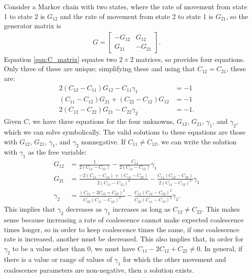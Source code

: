 \documentclass{article}
\begin{document}
Consider a Markov chain with two states, 
where the rate of movement from state 1 to state 2 is $G_{12}$
and the rate of movement from state 2 to state 1 is $G_{21}$,
so the generator matrix is
\begin{align*}
G = 
    \begin{bmatrix}
        -G_{12}  & G_{12} \\
         G_{21}  & -G_{21}
    \end{bmatrix}.
\end{align*}
Equation \ref{eqn:C_matrix} equates two $2 \times 2$ matrices,
so provides four equations. Only three of these are unique;
simplifying these and using that $C_{12} = C_{21}$, these are:
\begin{align*}
    2 \left(C_{12} - C_{11} \right) G_{12} - C_{11} \gamma_1 &= -1 \\
    \left(C_{11} - C_{12} \right) G_{21} + \left(C_{22} - C_{12}\right) G_{12} &= -1 \\
    2 \left( C_{12} - C_{22} \right) G_{21} - C_{22} \gamma_2 &= -1 .
\end{align*}
Given $C$, we have three equations for the four unknowns, 
$G_{12}$, $G_{21}$, $\gamma_{1}$, and $\gamma_{2}$,
which we can solve symbolically.
The valid solutions to these equations are those with $G_{12}$, $G_{21}$, $\gamma_1$,
and $\gamma_2$ nonnegative.
If $C_{11} \neq C_{12}$, 
we can write the solution with $\gamma_1$ as the free variable:
\begin{align*}
G_{12} &= \frac{1}{2(C_{11} - C_{12})} - \frac{C_{11}}{2(C_{11} - C_{12})}\gamma_1 \\
G_{21} &= \frac{-2(C_{11} - C_{12}) + (C_{12} - C_{22})}{2(C_{11} - C_{12})^2}
	- \frac{C_{11}(C_{12} - C_{22})}{2(C_{11} - C_{12})^2}\gamma_1 \\
\gamma_2 &= \frac{(C_{11} - 2C_{12} + C_{22})^2}{C_{22}(C_{11} - C_{12})^2}
	- \frac{C_{11}(C_{12} - C_{22})^2}{C_{22}(C_{11} - C_{12})^2}\gamma_1.
\end{align*}
This implies that $\gamma_2$ decreases as $\gamma_1$ increases as long as $C_{12} \neq C_{22}$.
This makes sense because
increasing a rate of coalescence cannot make expected coalescence times longer,
so in order to keep coalescence times the same,
if one coalescence rate is increased, another must be decreased.
This also implies that, in order for $\gamma_2$ to be a value other than $0$, 
we must have $C_{11} - 2C_{12} + C_{22} \neq 0$.
In general, if there is a value or range of values of $\gamma_1$
for which the other movement and coalescence parameters are non-negative,
then a solution exists.
\end{document}
